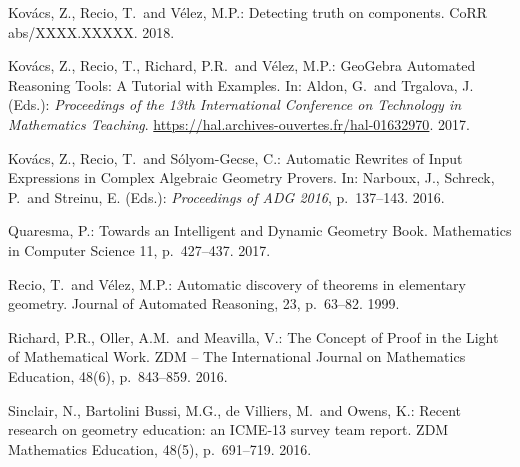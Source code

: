 \begin{thebibliography}{10}
Kov\'acs, Z., Recio, T.~and V\'elez, M.P.:
Detecting truth on components. CoRR abs/XXXX.XXXXX. 2018.

Kov\'acs, Z., Recio, T., Richard, P.R.~and V\'elez, M.P.: GeoGebra Automated
Reasoning Tools: A Tutorial with Examples. In: Aldon, G.~and Trgalova, J. (Eds.):
\textit{Proceedings of the 13th International
Conference on Technology in Mathematics Teaching}.
\url{https://hal.archives-ouvertes.fr/hal-01632970}. 2017.

Kov\'acs, Z., Recio, T.~and S\'olyom-Gecse, C.:
Automatic Rewrites of Input Expressions in Complex Algebraic Geometry Provers.
In: Narboux, J., Schreck, P.~and Streinu, E. (Eds.): \textit{Proceedings of ADG 2016}, p.~137--143. 2016.

Quaresma, P.: Towards an Intelligent and Dynamic Geometry Book.
Mathematics in Computer Science 11, p.~427--437. 2017.

Recio, T.~and V\'elez, M.P.:
Automatic discovery of theorems in elementary geometry.
Journal of Automated Reasoning, 23, p.~63--82.
1999.

Richard, P.R., Oller, A.M.~and Meavilla, V.:
The Concept of Proof in the Light of Mathematical Work.
ZDM -- The International Journal on Mathematics Education, 48(6), p.~843--859. 2016.

Sinclair, N., Bartolini Bussi, M.G., de Villiers, M.~and Owens, K.:
Recent research on geometry education: an ICME-13 survey team report.
ZDM Mathematics Education, 48(5), p.~691--719. 2016.


\end{thebibliography}

